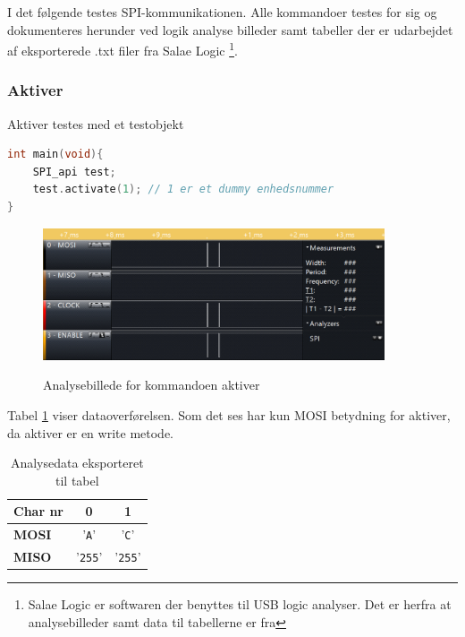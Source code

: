 \label{section:spi_integrationstest}

I det følgende testes SPI-kommunikationen. Alle kommandoer testes for sig og dokumenteres herunder ved logik analyse billeder samt tabeller der er udarbejdet af eksporterede .txt filer fra Salae Logic \footnote{Salae Logic er softwaren der benyttes til USB logic analyser. Det er herfra at analysebilleder samt data til tabellerne er fra}. 


\subsubsection*{Aktiver}

Aktiver testes med et testobjekt

\begin{lstlisting}[language=C]
int main(void){
	SPI_api test;
	test.activate(1); // 1 er et dummy enhedsnummer
}
\end{lstlisting}

\begin{figure}[H]
\centering
{\includegraphics[width=0.90\textwidth]{filer/integrationstest/billeder/spi_activate}}
\caption{Analysebillede for kommandoen aktiver}
\label{lab:scop_activate}
\end{figure}

Tabel \ref{table:scop_activate} viser dataoverførelsen. Som det ses har kun MOSI betydning for aktiver, da aktiver er en write metode. 

\begin{table}[H]
	\caption{Analysedata eksporteret til tabel}
	\centering
	\begin{tabular}{|l|c|c|}
		\hline 
		\textbf{Char nr} & \textbf{0} & \textbf{1} \\ 		
		\hline 
		\textbf{MOSI} & '\verb+A+' & '\verb+C+' \\ 
		\hline 
		\textbf{MISO} & '\verb+255+' & '\verb+255+' \\ 
		\hline 
	\end{tabular} 
	\label{table:scop_activate}
\end{table}


